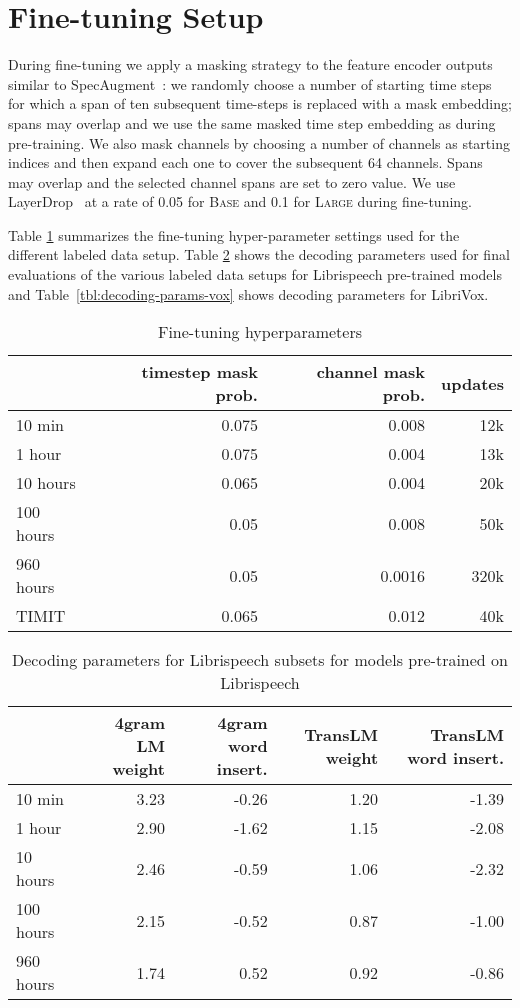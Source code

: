 \documentclass{article}
\newcommand{\wvppbase}{\textsc{Base}}
\newcommand{\wvppbig}{\textsc{Large}}
\newcommand{\vox}{LibriVox}
\newcommand{\libri}{Librispeech}
\begin{document}
\section{Fine-tuning Setup}
\label{app:finetune}

During fine-tuning we apply a masking strategy to the feature encoder outputs similar to SpecAugment~\citep{park2019specaugment}:
we randomly choose a number of starting time steps for which a span of ten subsequent time-steps is replaced with a mask embedding; spans may overlap and we use the same masked time step embedding as during pre-training. 
We also mask channels by choosing a number of channels as starting indices and then expand each one to cover the subsequent 64 channels.
Spans may overlap and the selected channel spans are set to zero value.
We use LayerDrop~\citep{huang2016deep,fan2019reducing} at a rate of 0.05 for \wvppbase{} and 0.1 for \wvppbig{} during fine-tuning.

Table \ref{tbl:fine-tuning} summarizes the fine-tuning hyper-parameter settings used for the different labeled data setup.
Table \ref{tbl:decoding-params-libri} shows the decoding parameters used for final evaluations of the various labeled data setups for Librispeech pre-trained models and Table~\ref{tbl:decoding-params-vox} shows decoding parameters for \vox{}.

\begin{table}[ht!]
\caption{Fine-tuning hyperparameters
}
\label{tbl:fine-tuning}
\centering 
\begin{tabular}{lrrr}
\toprule
{} & timestep mask prob. & channel mask prob. & updates \\
\midrule
10 min & 0.075 & 0.008 & 12k \\
1 hour & 0.075 & 0.004 & 13k \\
10 hours & 0.065 & 0.004 & 20k \\
100 hours & 0.05 & 0.008 & 50k \\
960 hours & 0.05 & 0.0016 & 320k \\
TIMIT & 0.065 & 0.012 & 40k \\
\bottomrule
\end{tabular}
\end{table}

\begin{table}[ht!]
\caption{Decoding parameters for \libri{} subsets for models pre-trained on Librispeech
}
\label{tbl:decoding-params-libri}
\centering 
\begin{tabular}{lrrrr}
\toprule
{} & 4gram LM weight & 4gram word insert. & TransLM weight & TransLM word insert. \\
\midrule
10 min & 3.23 & -0.26 & 1.20 & -1.39 \\
1 hour & 2.90 & -1.62 & 1.15 & -2.08 \\
10 hours & 2.46 & -0.59  & 1.06 & -2.32 \\
100 hours & 2.15 & -0.52 & 0.87 & -1.00 \\
960 hours & 1.74 & 0.52 & 0.92 & -0.86 \\
\bottomrule
\end{tabular}
\end{table}
\end{document}
